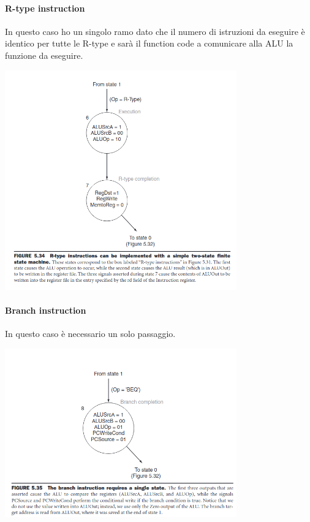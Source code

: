 \documentclass[12pt, a4paper, openany]{book}
\begin{document}
\paragraph*{R-type instruction}
In questo caso ho un singolo ramo dato che il numero di istruzioni da eseguire è identico
per tutte le R-type e sarà il function code a comunicare alla ALU la funzione da eseguire.
\begin{center}
    \includegraphics[width=100mm, scale=0.5]{R-type Automa.png}
\end{center}

\paragraph*{Branch instruction}
In questo caso è necessario un solo passaggio.
\begin{center}
    \includegraphics[width=100mm, scale=0.5]{Branch Automa.png}
\end{center}
\end{document}
